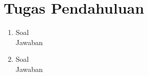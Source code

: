 \section*{Tugas Pendahuluan}
\begin{enumerate}
  \item Soal \\
  Jawaban
  \item Soal \\
  Jawaban
\end{enumerate}